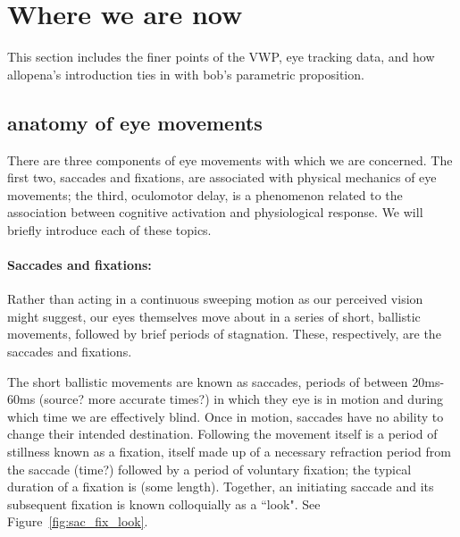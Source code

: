 \documentclass{article}
\begin{document}
\section{Where we are now}

This section includes the finer points of the VWP, eye tracking data, and how allopena's introduction ties in with bob's parametric proposition.

\subsection{anatomy of eye  movements}

There are three components of eye movements with which we are concerned. The first two, saccades and fixations, are associated with physical mechanics of eye movements; the third, oculomotor delay, is a phenomenon related to the association between cognitive activation and physiological response. We will briefly introduce each of these topics. 

\paragraph{Saccades and fixations:} Rather than acting in a continuous sweeping motion as our perceived vision might suggest, our eyes themselves move about in a series of short, ballistic movements, followed by brief periods of stagnation. These, respectively, are the saccades and fixations. 

The short ballistic movements are known as saccades, periods of between 20ms-60ms (source? more accurate times?) in which they eye is in motion and during which time we are effectively blind. Once in motion, saccades have no ability to change their intended destination. Following the movement itself is a period of stillness known as a fixation, itself made up of a necessary refraction period from the saccade (time?) followed by a period of voluntary fixation; the typical duration of a fixation is (some length). Together, an initiating saccade and its subsequent fixation is known colloquially as a ``look". See Figure~\ref{fig:sac_fix_look}.
\end{document}
